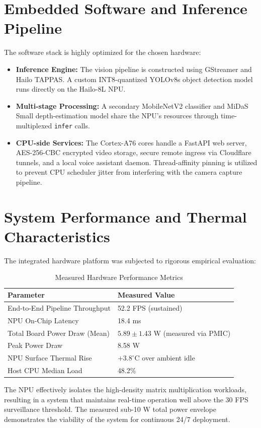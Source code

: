 \documentclass[a4paper,12pt]{article}
\begin{document}
\section{Embedded Software and Inference Pipeline}
The software stack is highly optimized for the chosen hardware:
\begin{itemize}
    \item \textbf{Inference Engine:} The vision pipeline is constructed using GStreamer and Hailo TAPPAS. A custom INT8-quantized YOLOv8s object detection model runs directly on the Hailo-8L NPU. 
    \item \textbf{Multi-stage Processing:} A secondary MobileNetV2 classifier and MiDaS Small depth-estimation model share the NPU's resources through time-multiplexed \texttt{infer} calls.
    \item \textbf{CPU-side Services:} The Cortex-A76 cores handle a FastAPI web server, AES-256-CBC encrypted video storage, secure remote ingress via Cloudflare tunnels, and a local voice assistant daemon. Thread-affinity pinning is utilized to prevent CPU scheduler jitter from interfering with the camera capture pipeline.
\end{itemize}

\section{System Performance and Thermal Characteristics}
The integrated hardware platform was subjected to rigorous empirical evaluation:

\begin{table}[h]
\centering
\caption{Measured Hardware Performance Metrics}
\begin{tabular}{@{}ll@{}}
\toprule
\textbf{Parameter} & \textbf{Measured Value} \\ \midrule
End-to-End Pipeline Throughput & 52.2 FPS (sustained) \\
NPU On-Chip Latency & 18.4 ms \\
Total Board Power Draw (Mean) & $5.89 \pm 1.43$ W (measured via PMIC) \\
Peak Power Draw & 8.58 W \\
NPU Surface Thermal Rise & $+3.8^\circ$C over ambient idle \\
Host CPU Median Load & 48.2\% \\ \bottomrule
\end{tabular}
\end{table}

The NPU effectively isolates the high-density matrix multiplication workloads, resulting in a system that maintains real-time operation well above the 30 FPS surveillance threshold. The measured sub-10 W total power envelope demonstrates the viability of the system for continuous 24/7 deployment.
\end{document}
